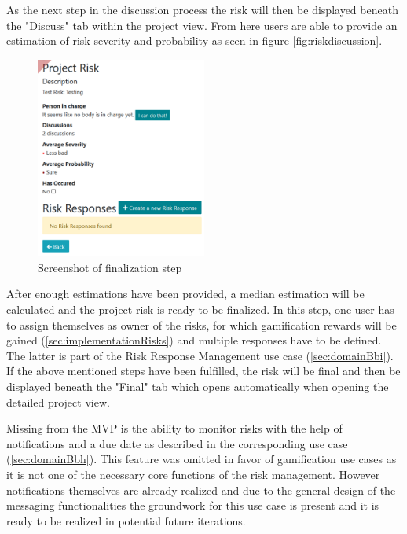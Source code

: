 As the next step in the discussion process the risk will then be displayed beneath the "Discuss" tab within the project view. From here users are able to provide an estimation of risk severity and probability as seen in figure \ref{fig:riskdiscussion}.

 \begin{figure}
	\includegraphics[width=0.5\textwidth]{Assets/implementation_shots/riskfinalization.png}
	\caption{Screenshot of finalization step}
	\label{fig:riskdfinalization}
\end{figure}

After enough estimations have been provided, a median estimation will be calculated and the project risk is ready to be finalized. In this step, one user has to assign themselves as owner of the risks, for which gamification rewards will be gained (\ref{sec:implementationRisks}) and multiple responses have to be defined. The latter is part of the Risk Response Management use case (\ref{sec:domainBbi}). If the above mentioned steps have been fulfilled, the risk will be final and then be displayed beneath the "Final" tab which opens automatically when opening the detailed project view.

 Missing from the MVP is the ability to monitor risks with the help of notifications and a due date as described in the corresponding use case (\ref{sec:domainBbh}). This feature was omitted in favor of gamification use cases as it is not one of the necessary core functions of the risk management. However notifications themselves are already realized and due to the general design of the messaging functionalities the groundwork for this use case is present and it is ready to be realized in potential future iterations.

